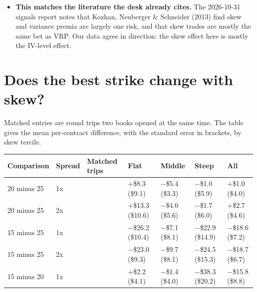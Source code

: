 \documentclass{article}
\begin{document}
\begin{itemize}
\begin{itemize}
\begin{itemize}
\item 15-delta: \$12.8 /\allowbreak{} \$12.7 /\allowbreak{} \$13.8.

\end{itemize}

\item In a regression of per-contract P\&L on skew and ATM IV, the skew coefficient is significant only for the 20-delta book (t = 2.1). It is insignificant for 25-delta (t = 0.8) and negative for 15-delta (t = \ensuremath{-}0.5). With three books tested, one t of 2.1 is weak evidence.

\end{itemize}

\item \textbf{This matches the literature the desk already cites.} The 2026-10-31 signals report notes that Kozhan, Neuberger \& Schneider (2013) find skew and variance premia are largely one risk, and that skew trades are mostly the same bet as VRP. Our data agree in direction: the skew effect here is mostly the IV-level effect.

\end{itemize}

\section{Does the best strike change with skew?}

Matched entries are round trips two books opened at the same time. The table gives the mean per-contract difference, with the standard error in brackets, by skew tercile.

\begin{center}\small
\begin{tabularx}{\linewidth}{l l >{\raggedright\arraybackslash}X >{\raggedright\arraybackslash}X l >{\raggedright\arraybackslash}X >{\raggedright\arraybackslash}X}
\toprule
\textbf{Comparison} & \textbf{Spread} & \textbf{Matched trips} & \textbf{Flat} & \textbf{Middle} & \textbf{Steep} & \textbf{All} \\
\midrule
20 minus 25 & 1x & 92 & +\$8.3 (\$9.1) & \ensuremath{-}\$5.4 (\$3.3) & \ensuremath{-}\$1.0 (\$5.9) & +\$1.0 (\$4.0) \\
20 minus 25 & 2x & 87 & +\$13.3 (\$10.6) & \ensuremath{-}\$4.0 (\$5.6) & \ensuremath{-}\$1.7 (\$6.0) & +\$2.7 (\$4.6) \\
15 minus 25 & 1x & 61 & \ensuremath{-}\$26.2 (\$10.4) & \ensuremath{-}\$7.1 (\$8.1) & \ensuremath{-}\$22.9 (\$14.9) & \ensuremath{-}\$18.6 (\$7.2) \\
15 minus 25 & 2x & 66 & \ensuremath{-}\$23.0 (\$9.3) & \ensuremath{-}\$9.7 (\$8.1) & \ensuremath{-}\$24.5 (\$15.3) & \ensuremath{-}\$18.7 (\$6.7) \\
15 minus 20 & 1x & 91 & +\$2.2 (\$4.1) & \ensuremath{-}\$1.4 (\$4.0) & \ensuremath{-}\$38.3 (\$20.2) & \ensuremath{-}\$15.8 (\$8.8) \\
\bottomrule
\end{tabularx}
\end{center}
\end{document}
